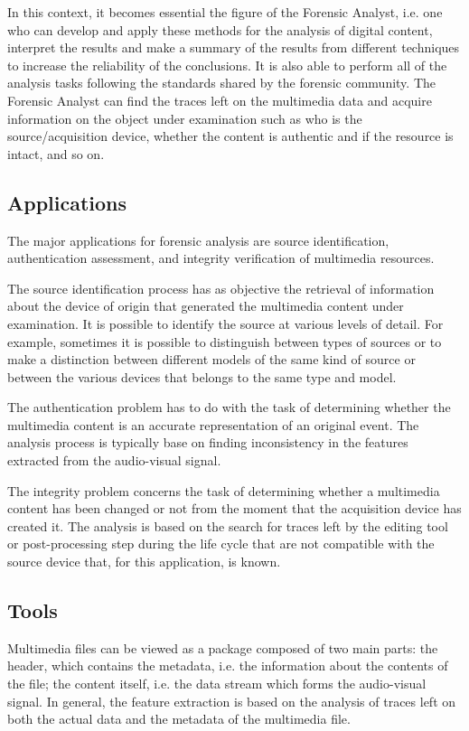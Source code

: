 In this context, it becomes essential the figure of the Forensic Analyst, i.e. one who can develop and apply these methods for the analysis of digital content, interpret the results and make a summary of the results from different techniques to increase the reliability of the conclusions. It is also able to perform all of the analysis tasks following the standards shared by the forensic community. The Forensic Analyst can find the traces left on the multimedia data and acquire information on the object under examination such as who is the source/acquisition device, whether the content is authentic and if the resource is intact, and so on.

\subsection{Applications}

The major applications for forensic analysis are source identification, authentication assessment, and integrity verification of multimedia resources.

The source identification process has as objective the retrieval of information about the device of origin that generated the multimedia content under examination. It is possible to identify the source at various levels of detail. For example, sometimes it is possible to distinguish between types of sources or to make a distinction between different models of the same kind of source or between the various devices that belongs to the same type and model.

The authentication problem has to do with the task of determining whether the multimedia content is an accurate representation of an original event. The analysis process is typically base on finding inconsistency in the features extracted from the audio-visual signal.

The integrity problem concerns the task of determining whether a multimedia content has been changed or not from the moment that the acquisition device has created it. The analysis is based on the search for traces left by the editing tool or post-processing step during the life cycle that are not compatible with the source device that, for this application, is known.

\subsection{Tools}

Multimedia files can be viewed as a package composed of two main parts: the header, which contains the metadata, i.e. the information about the contents of the file; the content itself, i.e. the data stream which forms the audio-visual signal.
In general, the feature extraction is based on the analysis of traces left on both the actual data and the metadata of the multimedia file.

